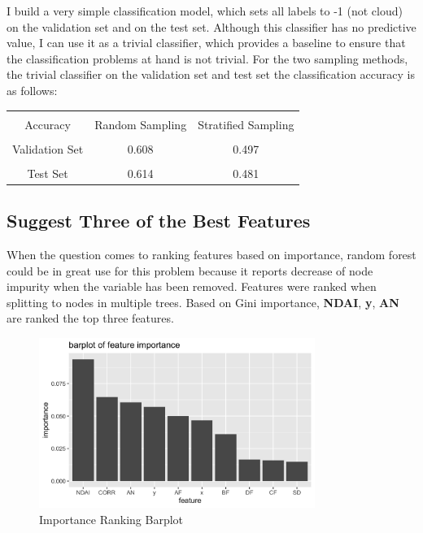 \documentclass[11pt]{article}
\begin{document}
I build a very simple classification model, which sets all labels to -1 (not cloud) on the validation set and on the test set. Although this classifier has no predictive value, I can use it as a trivial classifier, which provides a baseline to ensure that the classification problems at hand is not trivial. For the two sampling methods, the trivial classifier on the validation set and test set the classification accuracy is as follows:
\begin{table}[htbp]
\centering
	\begin{tabular}{|c|c|c|}  
		\hline  
		& & \\[-8pt]  
		Accuracy&Random Sampling&Stratified Sampling \\ 
		\hline
		& & \\[-8pt] 
		Validation Set&0.608&0.497 \\
		\hline
		& & \\[-8pt] 
		Test Set&0.614&0.481 \\
		\hline
	\end{tabular}
\end{table}

\subsection{Suggest Three of the Best Features}

When the question comes to ranking features based on importance, random forest could be in great use for this problem because it reports decrease of node impurity when the variable has been removed. Features were ranked when splitting to nodes in multiple trees. Based on Gini importance, \textbf{NDAI}, \textbf{y}, \textbf{AN} are ranked the top three features.
\begin{figure}[H]
  \centering
      \includegraphics[width=0.8\textwidth, height=0.5\textwidth]{../figures/ranking.png}
  \caption{Importance Ranking Barplot}
\end{figure}
\end{document}
